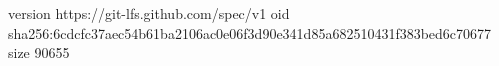 version https://git-lfs.github.com/spec/v1
oid sha256:6cdcfc37aec54b61ba2106ac0e06f3d90e341d85a682510431f383bed6c70677
size 90655

